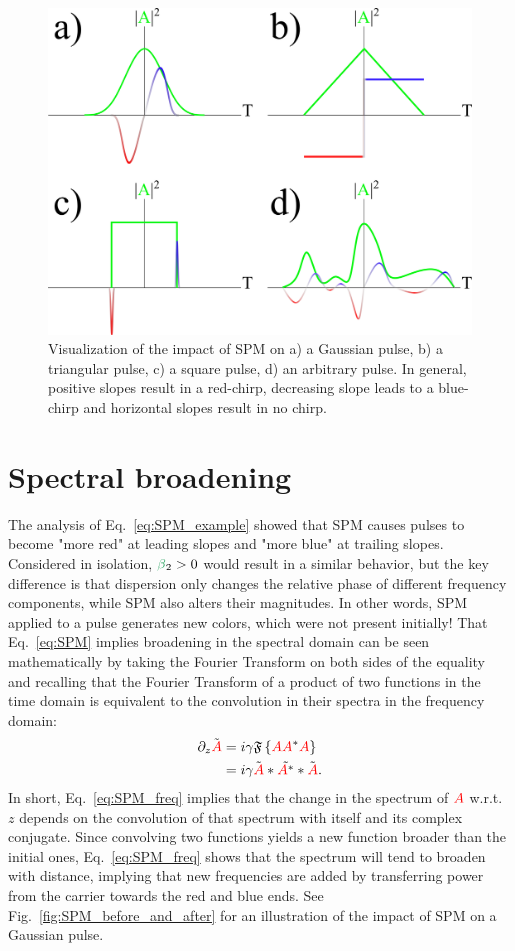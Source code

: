 \begin{figure}
    \centering
    \includegraphics[width=0.75\linewidth]{figures/SPM_chirp.png}
    \caption{Visualization of the impact of SPM on a) a Gaussian pulse, b) a triangular pulse, c) a square pulse, d) an arbitrary pulse. In general, positive slopes result in a red-chirp, decreasing slope leads to a blue-chirp and horizontal slopes result in no chirp.   }
    \label{fig:chirp_profiles}
\end{figure}


\section{Spectral broadening}
The analysis of Eq.~\ref{eq:SPM_example} showed that SPM causes pulses to become "more red" at leading slopes and "more blue" at trailing slopes. Considered in isolation, $\betag_2>0$ would result in a similar behavior, but the key difference is that dispersion only changes the relative phase of different frequency components, while SPM also alters their magnitudes. In other words, SPM applied to a pulse generates new colors, which were not present initially! That Eq.~\ref{eq:SPM} implies broadening in the spectral domain can be seen mathematically by taking the Fourier Transform on both sides of the equality and recalling that the Fourier Transform of a product of two functions in the time domain is equivalent to the convolution in their spectra in the frequency domain:
\begin{align}
\label{eq:SPM_freq}
    \partial_z\Tilde{\textcolor{red}{A}} &= i\gamma \mathfrak{F}\left\{\textcolor{red}{A}\textcolor{red}{A}^*\textcolor{red}{A}\right\} \\ \nonumber
    &= i\gamma \Tilde{\textcolor{red}{A}}*\Tilde{\textcolor{red}{A}^*}*\Tilde{\textcolor{red}{A}}.
\end{align}
In short, Eq.~\ref{eq:SPM_freq} implies that the change in the spectrum of $\textcolor{red}{A}$ w.r.t. $z$ depends on the convolution of that spectrum with itself and its complex conjugate. Since convolving two functions yields a new function broader than the initial ones, Eq.~\ref{eq:SPM_freq} shows that the spectrum will tend to broaden with distance, implying that new frequencies are added by transferring power from the carrier towards the red and blue ends. See Fig.~\ref{fig:SPM_before_and_after} for an illustration of the impact of SPM on a Gaussian pulse.


